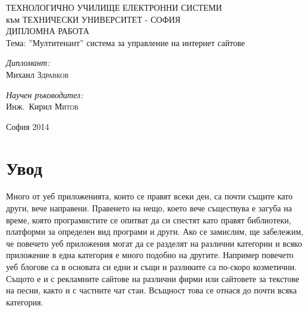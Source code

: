 \documentclass[pdftex,14pt,a4paper]{extreport}
\begin{document}
\setcounter{secnumdepth}{3}
\setcounter{tocdepth}{3}
\begin{titlepage}
	\begin{center}
		{\Huge ТЕХНОЛОГИЧНО УЧИЛИЩЕ ЕЛЕКТРОННИ СИСТЕМИ\\[0.5cm]} {\Large към ТЕХНИЧЕСКИ УНИВЕРСИТЕТ - СОФИЯ\\[3cm]}
		{\Huge ДИПЛОМНА РАБОТА\\[3cm]}
		Тема: ''Мултитенант'' система за управление на интернет сайтове\\[3cm]
		\begin{minipage}{0.4\textwidth}
			\begin{flushleft} \large
				\emph{Дипломант:}\\
				Михаил \textsc{Здравков}
			\end{flushleft}
		\end{minipage}
		\begin{minipage}{0.4\textwidth}
			\begin{flushright} \large
				\emph{Научен ръководител:} \\
				Инж.~Кирил \textsc{Митов}
			\end{flushright}
		\end{minipage}

		\vfill

		{\large София 2014}

	\end{center}
\end{titlepage}
\tableofcontents
\listoftables
\listoffigures
\pagebreak
{}
\chapter*{Увод}
Много от уеб приложенията, които се правят всеки ден, са почти същите като други, вече направени. Правенето на нещо, което вече съществува е загуба на време, която програмистите се опитват да си спестят като правят библиотеки, платформи за определен вид програми и други. Ако се замислим, ще забележим, че повечето уеб приложения могат да се разделят на различни категории и всяко приложение в една категория е много подобно на другите. Например повечето уеб блогове са в основата си едни и същи и разликите са по-скоро козметични. Същото е и с рекламните сайтове на различни фирми или сайтовете за текстове на песни, както и с частните чат стаи. Всъщност това се отнася до почти всяка категория.
\end{document}
